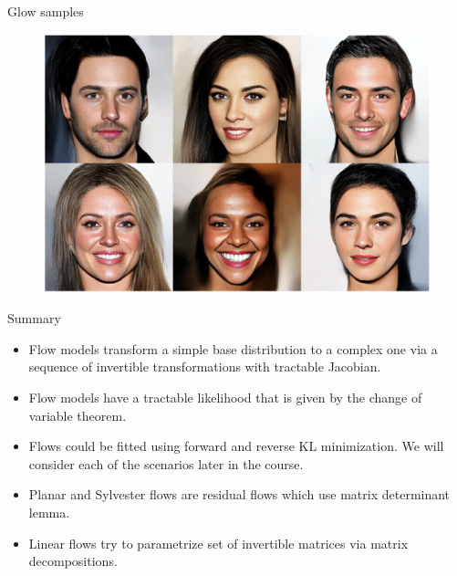 \begin{frame}{Glow samples}
	\begin{figure}
		\centering
		\includegraphics[width=\linewidth]{figs/glow_faces.png}
	\end{figure}
\end{frame}
\begin{frame}{Summary}
	\begin{itemize}
		\item Flow models transform a simple base distribution to a complex one via a sequence of invertible transformations with tractable Jacobian.
		\vfill
		\item Flow models have a tractable likelihood that is given by the change of variable theorem.
		\vfill
		\item Flows could be fitted using forward and reverse KL minimization. We will consider each of the scenarios later in the course.
		\vfill
		\item Planar and Sylvester flows are residual flows which use matrix determinant lemma. 
		\vfill 
		\item Linear flows try to parametrize set of invertible matrices via matrix decompositions.
	\end{itemize}
\end{frame}
 